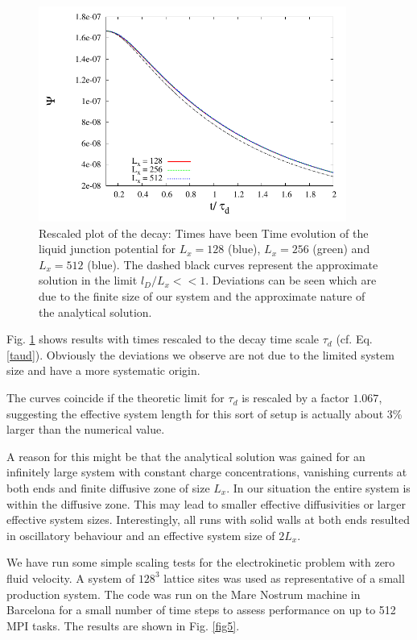 \documentclass[aps,pre,preprint,groupedaddress]{revtex4-1}
\begin{document}
\begin{figure}[h!t]
\includegraphics[width=0.9\textwidth]{test_lj_decay1.pdf}
\caption{Rescaled plot of the decay: Times have been Time evolution of the liquid junction potential for $L_x=128$ (blue), $L_x=256$ (green) and $L_x=512$ (blue). The dashed black curves represent the approximate solution in the limit $l_D/L_x<<1$. Deviations can be seen which are due
to the finite size of our system and the approximate nature of the analytical solution.} 
\label{fig4} 
\end{figure}

Fig. \ref{fig4} shows results with times rescaled to the decay 
time scale $\tau_d$ (cf. Eq. \ref{taud}). Obviously the 
deviations we observe are not due to the limited system size 
and have a more systematic origin. 

The curves coincide if 
the theoretic limit for $\tau_d$ is rescaled by a factor $1.067$,
suggesting the effective system length for this sort of setup is
actually about 3\% larger than the numerical value.

A reason for this might be that the analytical solution was gained
for an infinitely large system with constant charge concentrations,
vanishing currents at both ends and finite diffusive zone of size $L_x$.
In our situation the entire system is within the diffusive zone.
This may lead to smaller effective diffusivities or larger effective
system sizes.
Interestingly, all runs with solid walls at both ends resulted in 
oscillatory behaviour and an effective system size of $2L_x$.


We have run some simple scaling tests for the electrokinetic problem
with zero fluid velocity. A system of $128^3$ lattice sites was used
as representative of a small production system. The code was run on
the Mare Nostrum machine in Barcelona for a small number of time
steps to assess performance on up to 512 MPI tasks. The results are
shown in Fig. \ref{fig5}. 
\end{document}
